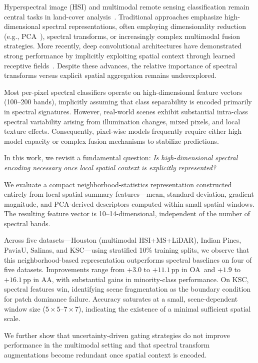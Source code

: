 \documentclass[journal]{IEEEtran}
\newcommand{\pp}{\,\text{pp}}
\newcommand{\OA}{\ensuremath{\mathrm{OA}}}
\newcommand{\Acc}{\ensuremath{\mathrm{AA}}}  %
\begin{document}
Hyperspectral image (HSI) and multimodal remote sensing classification
remain central tasks in land-cover analysis~\cite{bioucasdias2013_hsi_challenges}.
Traditional approaches emphasize high-dimensional spectral
representations, often employing dimensionality reduction
(e.g., PCA~\cite{green1988_mnf_transform}), spectral transforms, or
increasingly complex multimodal fusion strategies. More recently,
deep convolutional architectures have demonstrated strong performance
by implicitly exploiting spatial context through learned receptive
fields~\cite{hu2015_deep_cnn_hsi}. Despite these advances, the relative
importance of spectral transforms versus explicit spatial aggregation
remains underexplored.

Most per-pixel spectral classifiers operate on high-dimensional
feature vectors (100--200 bands), implicitly assuming that class
separability is encoded primarily in spectral signatures. However,
real-world scenes exhibit substantial intra-class spectral variability
arising from illumination changes, mixed pixels, and local texture
effects. Consequently, pixel-wise models frequently require either
high model capacity or complex fusion mechanisms to stabilize
predictions.

In this work, we revisit a fundamental question:
\emph{Is high-dimensional spectral encoding necessary once local
spatial context is explicitly represented?}

We evaluate a compact neighborhood-statistics representation
constructed entirely from local spatial summary features---mean,
standard deviation, gradient magnitude, and PCA-derived descriptors
computed within small spatial windows. The resulting feature vector
is 10--14-dimensional, independent of the number of spectral bands.

Across five datasets---Houston (multimodal HSI+MS+LiDAR), Indian
Pines, PaviaU, Salinas, and KSC---using stratified 10\% training
splits, we observe that this neighborhood-based representation
outperforms spectral baselines on four of five datasets. Improvements
range from $+3.0$ to $+11.1\pp$ in \OA\ and $+1.9$ to $+16.1\pp$ in
\Acc, with substantial gains in minority-class performance. On KSC,
spectral features win, identifying scene fragmentation as the boundary
condition for patch dominance failure. Accuracy
saturates at a small, scene-dependent window size
($5{\times}5$--$7{\times}7$), indicating the existence of a minimal
sufficient spatial scale.

We further show that uncertainty-driven gating strategies do not
improve performance in the multimodal setting and that spectral
transform augmentations become redundant once spatial context is
encoded.
\end{document}
